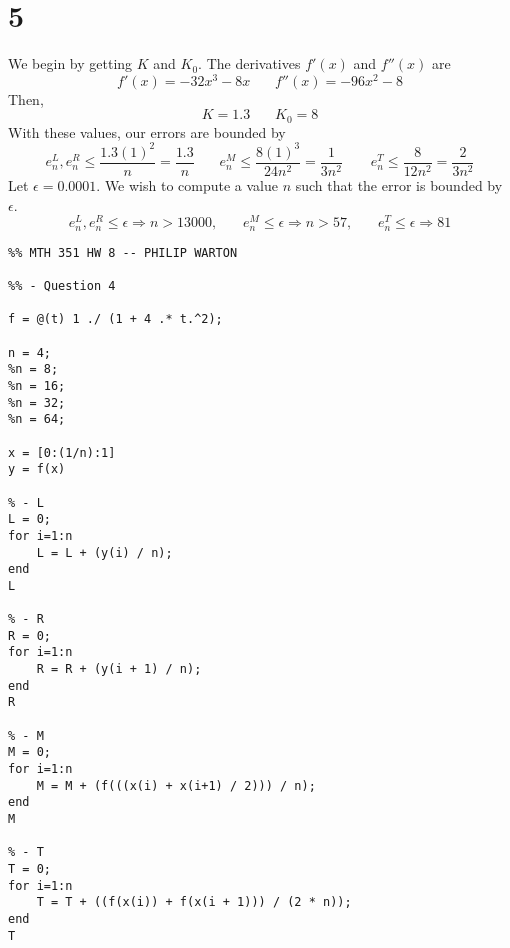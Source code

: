 \documentclass{article}
\begin{document}
\section*{5}
We begin by getting $K$ and $K_0$. The derivatives $f'(x)$ and $f''(x)$ are
\[ f'(x) = -32x^3 - 8x \ \ \ \ \ \ \ \ f''(x) = -96x^2 - 8 \]
Then,
\[ K = 1.3 \ \ \ \  \ \ \ \  K_0= 8\]
With these values, our errors are bounded by
\[ e_n^L, e_n^R \leqslant \frac{1.3(1)^2}{n} = \frac{1.3}{n} \ \ \ \ \ \ \ \ e_n^M \leqslant \frac{8(1)^3}{24n^2} = \frac{1}{3n^2} \ \ \ \ \ \ \ \ \ e_n^T \leqslant \frac{8}{12n^2} = \frac{2}{3n^2} \]
Let $\epsilon = 0.0001$. We wish to compute a value $n$ such that the error is bounded by $\epsilon$.
\[ e_n^L, e_n^R \leqslant \epsilon \Rightarrow n > 13000, \ \ \ \ \ \ \ \ e_n^M \leqslant \epsilon \Rightarrow n > 57, \ \ \ \ \ \ \ \ e_n^T \leqslant \epsilon \Rightarrow 81 \]
\newpage
\begin{verbatim}
%% MTH 351 HW 8 -- PHILIP WARTON

%% - Question 4

f = @(t) 1 ./ (1 + 4 .* t.^2);

n = 4;
%n = 8;
%n = 16;
%n = 32;
%n = 64;

x = [0:(1/n):1]
y = f(x)

% - L
L = 0;
for i=1:n
    L = L + (y(i) / n);
end
L

% - R
R = 0;
for i=1:n
    R = R + (y(i + 1) / n);
end
R

% - M
M = 0;
for i=1:n
    M = M + (f(((x(i) + x(i+1) / 2))) / n);
end
M

% - T
T = 0;
for i=1:n
    T = T + ((f(x(i)) + f(x(i + 1))) / (2 * n));
end
T
\end{verbatim}
\end{document}
